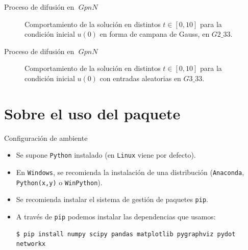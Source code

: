 \documentclass{beamer}
\theoremstyle{definition}
\numberwithin{equation}{section}
\DeclareMathOperator{\gpn}{\mathit{{GpnN}}}
\begin{document}
\begin{frame}{Proceso de difusión en $\gpn$}
	\begin{figure}
		\caption{Comportamiento de la solución en distintos $t\in[0,10]$ para la condición inicial $u(0)$ en forma de campana de Gauss, en $\mathit{G2\_33}$.}
	\end{figure}
\end{frame}
\begin{frame}{Proceso de difusión en $\gpn$}
	\begin{figure}
		\caption{Comportamiento de la solución en distintos $t\in[0,10]$ para la condición inicial $u(0)$ con entradas aleatorias en $\mathit{G3\_33}$.}
	\end{figure}
\end{frame}

\section{Sobre el uso del paquete}

\begin{frame}[fragile]{Configuración de ambiente}
	\begin{itemize}[<+- | alert@+>]
		\item Se supone \texttt{Python} instalado (en \texttt{Linux} viene por defecto).
		\item En \texttt{Windows}, se recomienda la instalación de una distribución (\texttt{Anaconda}, \texttt{Python(x,y)} o \texttt{WinPython}).
		\item Se recomienda instalar el sistema de gestión de paquetes \texttt{pip}.
		\item A través de \texttt{pip} podemos instalar las dependencias que usamos:
		\begin{lstlisting}[caption=Terminal o símbolo del sistema,basicstyle=\tiny]
		$ pip install numpy scipy pandas matplotlib pygraphviz pydot networkx	
		\end{lstlisting}
		
	\end{itemize}
\end{frame}
\end{document}

